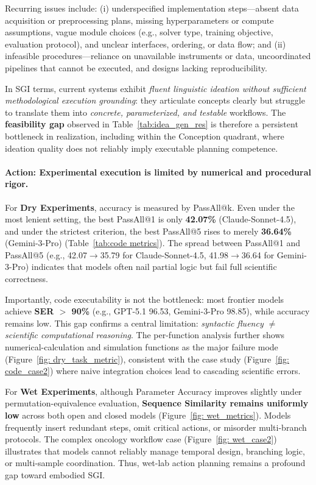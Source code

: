 Recurring issues include: (i) underspecified implementation steps—absent data acquisition or preprocessing plans, missing hyperparameters or compute assumptions, vague module choices (e.g., solver type, training objective, evaluation protocol), and unclear interfaces, ordering, or data flow; and (ii) infeasible procedures—reliance on unavailable instruments or data, uncoordinated pipelines that cannot be executed, and designs lacking reproducibility.

In SGI terms, current systems exhibit \emph{fluent linguistic ideation without sufficient methodological execution grounding}: they articulate concepts clearly but struggle to translate them into \emph{concrete, parameterized, and testable} workflows. The \textbf{feasibility gap} observed in Table~\ref{tab:idea_gen_res} is therefore a persistent bottleneck in realization, including within the Conception quadrant, where ideation quality does not reliably imply executable planning competence.



\paragraph{Action: Experimental execution is limited by numerical and procedural rigor.}
For \textbf{Dry Experiments}, accuracy is measured by PassAll@k. Even under the most lenient setting, the best PassAll@1 is only \textbf{42.07\%} (Claude-Sonnet-4.5), and under the strictest criterion, the best PassAll@5 rises to merely \textbf{36.64\%} (Gemini-3-Pro) (Table~\ref{tab:code metrics}). The spread between PassAll@1 and PassAll@5 (e.g., 42.07$\to$35.79 for Claude-Sonnet-4.5, 41.98$\to$36.64 for Gemini-3-Pro) indicates that models often nail partial logic but fail full scientific correctness.

Importantly, code executability is not the bottleneck: most frontier models achieve \textbf{SER $>$ 90\%} (e.g., GPT-5.1 96.53, Gemini-3-Pro 98.85), while accuracy remains low. This gap confirms a central limitation: \emph{syntactic fluency $\neq$ scientific computational reasoning}. The per-function analysis further shows numerical-calculation and simulation functions as the major failure mode (Figure~\ref{fig: dry_task_metric}), consistent with the case study (Figure~\ref{fig: code_case2}) where naive integration choices lead to cascading scientific errors.

For \textbf{Wet Experiments}, although Parameter Accuracy improves slightly under permutation-equivalence evaluation, \textbf{Sequence Similarity remains uniformly low} across both open and closed models (Figure~\ref{fig: wet_metrics}). Models frequently insert redundant steps, omit critical actions, or misorder multi-branch protocols. The complex oncology workflow case (Figure~\ref{fig: wet_case2}) illustrates that models cannot reliably manage temporal design, branching logic, or multi-sample coordination. Thus, wet-lab action planning remains a profound gap toward embodied SGI.


